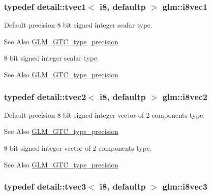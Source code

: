 \hypertarget{group__gtc__type__precision_gae67d2e1e7ebd1a79176cac554395b881}{
\subsubsection[{i8vec1}]{\setlength{\rightskip}{0pt plus 5cm}typedef detail\-::tvec1$<$ i8, defaultp $>$ {\bf glm\-::i8vec1}}}\label{group__gtc__type__precision_gae67d2e1e7ebd1a79176cac554395b881}
Default precision 8 bit signed integer scalar type. \begin{DoxySeeAlso}{See Also}
\hyperlink{group__gtc__type__precision}{G\-L\-M\-\_\-\-G\-T\-C\-\_\-type\-\_\-precision}
\end{DoxySeeAlso}
8 bit signed integer scalar type. \begin{DoxySeeAlso}{See Also}
\hyperlink{group__gtc__type__precision}{G\-L\-M\-\_\-\-G\-T\-C\-\_\-type\-\_\-precision} 
\end{DoxySeeAlso}
\hypertarget{group__gtc__type__precision_gafd7bbd3878c298014276975f999a8677}{
\subsubsection[{i8vec2}]{\setlength{\rightskip}{0pt plus 5cm}typedef detail\-::tvec2$<$ i8, defaultp $>$ {\bf glm\-::i8vec2}}}\label{group__gtc__type__precision_gafd7bbd3878c298014276975f999a8677}
Default precision 8 bit signed integer vector of 2 components type. \begin{DoxySeeAlso}{See Also}
\hyperlink{group__gtc__type__precision}{G\-L\-M\-\_\-\-G\-T\-C\-\_\-type\-\_\-precision}
\end{DoxySeeAlso}
8 bit signed integer vector of 2 components type. \begin{DoxySeeAlso}{See Also}
\hyperlink{group__gtc__type__precision}{G\-L\-M\-\_\-\-G\-T\-C\-\_\-type\-\_\-precision} 
\end{DoxySeeAlso}
\hypertarget{group__gtc__type__precision_gae1e3127c58fbf1b6fbf28885cfd3dfad}{
\subsubsection[{i8vec3}]{\setlength{\rightskip}{0pt plus 5cm}typedef detail\-::tvec3$<$ i8, defaultp $>$ {\bf glm\-::i8vec3}}}\label{group__gtc__type__precision_gae1e3127c58fbf1b6fbf28885cfd3dfad}
